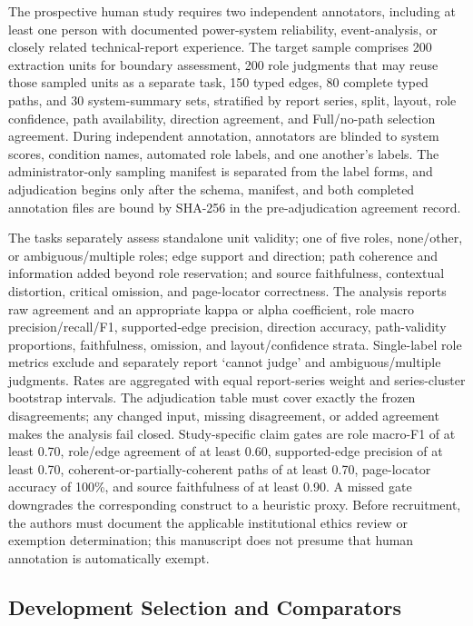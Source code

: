 \documentclass[applsci,article,submit,moreauthors]{Definitions/mdpi}
\begin{document}
The prospective human study requires two independent annotators, including at least one person with documented power-system reliability, event-analysis, or closely related technical-report experience. The target sample comprises 200 extraction units for boundary assessment, 200 role judgments that may reuse those sampled units as a separate task, 150 typed edges, 80 complete typed paths, and 30 system-summary sets, stratified by report series, split, layout, role confidence, path availability, direction agreement, and Full/no-path selection agreement. During independent annotation, annotators are blinded to system scores, condition names, automated role labels, and one another's labels. The administrator-only sampling manifest is separated from the label forms, and adjudication begins only after the schema, manifest, and both completed annotation files are bound by SHA-256 in the pre-adjudication agreement record.

The tasks separately assess standalone unit validity; one of five roles, none/other, or ambiguous/multiple roles; edge support and direction; path coherence and information added beyond role reservation; and source faithfulness, contextual distortion, critical omission, and page-locator correctness. The analysis reports raw agreement and an appropriate kappa or alpha coefficient, role macro precision/recall/F1, supported-edge precision, direction accuracy, path-validity proportions, faithfulness, omission, and layout/confidence strata. Single-label role metrics exclude and separately report `cannot judge' and ambiguous/multiple judgments. Rates are aggregated with equal report-series weight and series-cluster bootstrap intervals. The adjudication table must cover exactly the frozen disagreements; any changed input, missing disagreement, or added agreement makes the analysis fail closed. Study-specific claim gates are role macro-F1 of at least 0.70, role/edge agreement of at least 0.60, supported-edge precision of at least 0.70, coherent-or-partially-coherent paths of at least 0.70, page-locator accuracy of 100\%, and source faithfulness of at least 0.90. A missed gate downgrades the corresponding construct to a heuristic proxy. Before recruitment, the authors must document the applicable institutional ethics review or exemption determination; this manuscript does not presume that human annotation is automatically exempt.

\subsection{Development Selection and Comparators}
\end{document}

